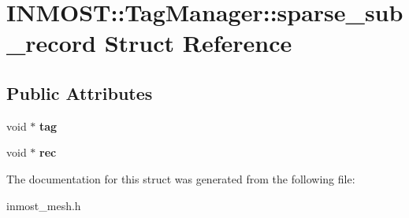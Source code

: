 \hypertarget{structINMOST_1_1TagManager_1_1sparse__sub__record}{\section{I\-N\-M\-O\-S\-T\-:\-:Tag\-Manager\-:\-:sparse\-\_\-sub\-\_\-record Struct Reference}
\label{structINMOST_1_1TagManager_1_1sparse__sub__record}
}
\subsection*{Public Attributes}
\begin{DoxyCompactItemize}
\item 
\hypertarget{structINMOST_1_1TagManager_1_1sparse__sub__record_ad60c667d7567fdb5732830f1ef58c44d}{void $\ast$ {\bfseries tag}}\label{structINMOST_1_1TagManager_1_1sparse__sub__record_ad60c667d7567fdb5732830f1ef58c44d}

\item 
\hypertarget{structINMOST_1_1TagManager_1_1sparse__sub__record_a091c6d2e6c7b87afc7ab34ce105f22ac}{void $\ast$ {\bfseries rec}}\label{structINMOST_1_1TagManager_1_1sparse__sub__record_a091c6d2e6c7b87afc7ab34ce105f22ac}

\end{DoxyCompactItemize}


The documentation for this struct was generated from the following file\-:\begin{DoxyCompactItemize}
\item 
inmost\-\_\-mesh.\-h\end{DoxyCompactItemize}
